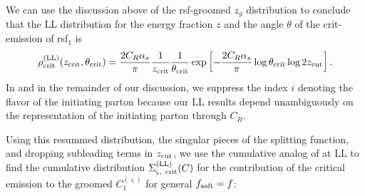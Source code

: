 \begin{example}
    We can use the discussion above of the \gls{rsf}-groomed \(z_g\) distribution to conclude that the LL distribution for the energy fraction \(z\) and the angle \(\theta\) of the \gls{crit-emission} of \gls{rsf}\(_1\) is
    \begin{equation}
        \rho^{\rm(LL)}_{\rm crit}(\zcrit, \thetacrit)
        =
        \frac{2 C_R \alpha_s}{\pi}
        \frac{1}{\zcrit}\frac{1}{\thetacrit}
        \exp\left[-\frac{2 C_R \alpha_s}{\pi}
        \log\thetacrit
        \log 2 \zcut
        \right]
        .
        \label{eq:LLcrit_ztheta}
    \end{equation}
    In  and in the remainder of our discussion, we suppress the index \(i\) denoting the flavor of the initiating parton because our LL results depend unambiguously on the representation of the initiating parton through \(C_R\).

    Using this resummed distribution, the singular pieces of the splitting function, and dropping subleading terms in \(z_{\rm cut}\), we use the cumulative analog of  at LL to find the cumulative distribution \(\Sigma^{\rm(LL)}_{\varsigma,~{\rm crit}}(C)\) for the contribution of the critical emission to the groomed \(C_1^{(\varsigma)}\)  for general \(f_{\rm soft}=f\):



\end{example}
